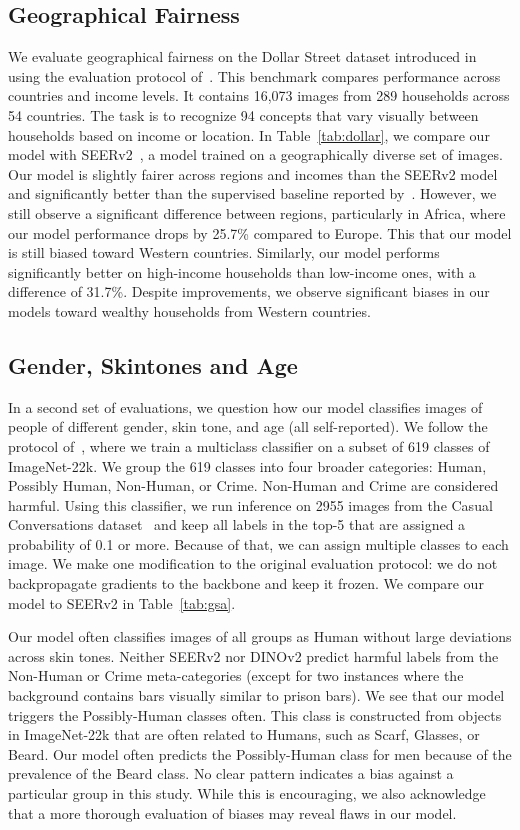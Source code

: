 \subsection{Geographical Fairness} We evaluate geographical fairness on the Dollar Street dataset introduced in~\cite{de2019does} using the evaluation protocol of~\citet{goyal2022fairness}. 
This benchmark compares performance across countries and income levels. It contains 16,073 images from 289 households across 54 countries. The task is to recognize 94 concepts that vary visually between households based on income or location. In Table~\ref{tab:dollar}, we compare our model with SEERv2~\citep{goyal2022vision}, a model trained on a geographically diverse set of images. Our model is slightly fairer across regions and incomes than the SEERv2 model and significantly better than the supervised baseline reported by~\citet{goyal2022vision}.
However, we still observe a significant difference between regions, particularly in Africa, where our model performance drops by 25.7\% compared to Europe. This  that our model is still biased toward Western countries. Similarly, our model performs significantly better on high-income households than low-income ones, with a difference of 31.7\%.
Despite improvements, we observe significant biases in our models toward wealthy households from Western countries.

\subsection{Gender, Skintones and Age} In a second set of evaluations, we question how our model classifies images of people of different gender, skin tone, and age (all self-reported). We follow the protocol of~\cite{goyal2022fairness}, where we train a multiclass classifier on a subset of 619 classes of ImageNet-22k. We group the 619 classes into four broader categories: Human, Possibly Human, Non-Human, or Crime. Non-Human and Crime are considered harmful. Using this classifier, we run inference on 2955 images from the Casual Conversations dataset~\citep{hazirbas2021towards} and keep all labels in the top-5 that are assigned a probability of 0.1 or more. Because of that, we can assign multiple classes to each image. We make one modification to the original evaluation protocol: we do not backpropagate gradients to the backbone and keep it frozen. We compare our model to SEERv2 in Table~\ref{tab:gsa}. 

Our model often classifies images of all groups as Human without large deviations across skin tones. Neither SEERv2 nor DINOv2  predict harmful labels from the Non-Human or Crime meta-categories (except for two instances where the background contains bars visually similar to prison bars). We see that our model triggers the Possibly-Human classes often. This class is constructed from objects in ImageNet-22k that are often related to Humans, such as Scarf, Glasses, or Beard. Our model often predicts the Possibly-Human class for men because of the prevalence of the Beard class. No clear pattern indicates a bias against a particular group in this study. While this is encouraging, we also acknowledge that a more thorough evaluation of biases may reveal flaws in our model.

